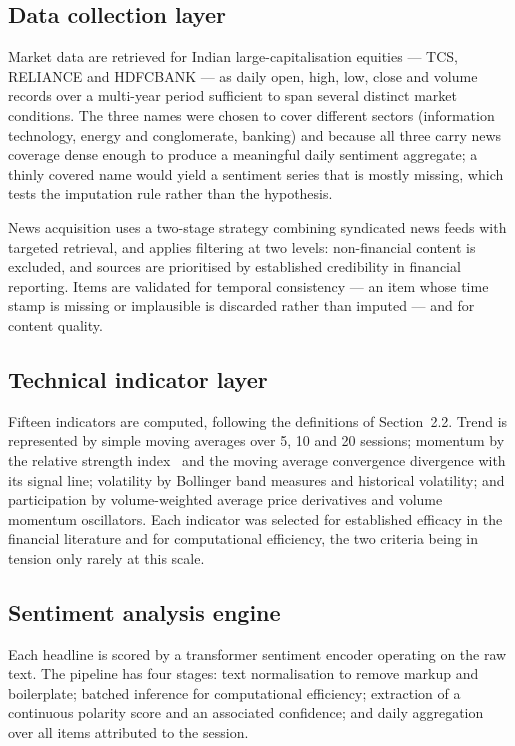 \subsection{Data collection layer}

Market data are retrieved for Indian large-capitalisation equities --- TCS, RELIANCE and
HDFCBANK --- as daily open, high, low, close and volume records over a multi-year period
sufficient to span several distinct market conditions. The three names were chosen to cover
different sectors (information technology, energy and conglomerate, banking) and because all
three carry news coverage dense enough to produce a meaningful daily sentiment aggregate; a
thinly covered name would yield a sentiment series that is mostly missing, which tests the
imputation rule rather than the hypothesis.

News acquisition uses a two-stage strategy combining syndicated news feeds with targeted
retrieval, and applies filtering at two levels: non-financial content is excluded, and sources
are prioritised by established credibility in financial reporting. Items are validated for
temporal consistency --- an item whose time stamp is missing or implausible is discarded rather
than imputed --- and for content quality.

\subsection{Technical indicator layer}

Fifteen indicators are computed, following the definitions of Section~2.2. Trend is represented
by simple moving averages over 5, 10 and 20 sessions; momentum by the relative strength
index~\cite{wilder1978} and the moving average convergence divergence with its signal line;
volatility by Bollinger band measures and historical volatility; and participation by
volume-weighted average price derivatives and volume momentum oscillators. Each indicator was
selected for established efficacy in the financial literature and for computational efficiency,
the two criteria being in tension only rarely at this scale.

\subsection{Sentiment analysis engine}

Each headline is scored by a transformer sentiment encoder operating on the raw text. The
pipeline has four stages: text normalisation to remove markup and boilerplate; batched inference
for computational efficiency; extraction of a continuous polarity score and an associated
confidence; and daily aggregation over all items attributed to the session.


